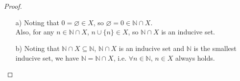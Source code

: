 \documentclass{article}
\newcommand{\NN}{\mathbb{N}}
\begin{document}
\section{}

\begin{proof}\quad
    \begin{itemize}
        \item [a)] Noting that $0 = \varnothing \in X$, so $\varnothing = 0 \in \NN \cap X$. \\
        Also, for any $n \in \NN \cap X$, $n \cup \{n\} \in X$, so $\NN \cap X$ is an inducive set. 
        \item [b)] Noting that $\NN \cap X \subseteq \NN$, $\NN \cap X$ is an inducive set and $\NN$ is the smallest inducive set, we have $\NN = \NN \cap X$, i.e. $\forall n \in \NN$, $n \in X$ always holds.        
    \end{itemize}
\end{proof}
\end{document}

